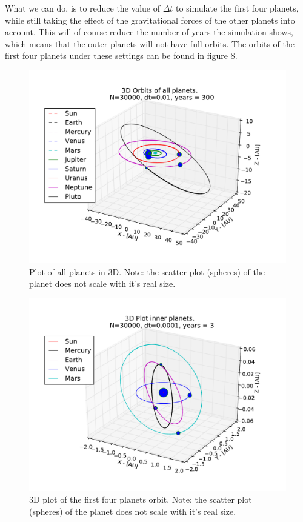\documentclass[12pt]{article}
\begin{document}
What we can do, is to reduce the value of $\Delta t$ to simulate the first four planets, while still taking the effect of the gravitational forces of the other planets into account. This will of course reduce the number of years the simulation shows, which means that the outer planets will not have full orbits. The orbits of the first four planets under these settings can be found in figure 8.

\begin{figure}[hbtp]
\centering
\includegraphics[width=\linewidth]{Plots/All_planets_3D_plot.pdf}
\caption{Plot of all planets in 3D. Note: the scatter plot (spheres) of the planet does not scale with it's real size.}
\end{figure}
\begin{figure}[hbtp]
\centering
\includegraphics[width=\linewidth]{Plots/First_planets_3D_plot.pdf}
\caption{3D plot of the first four planets orbit. Note: the scatter plot (spheres) of the planet does not scale with it's real size.}
\end{figure}
\end{document}
